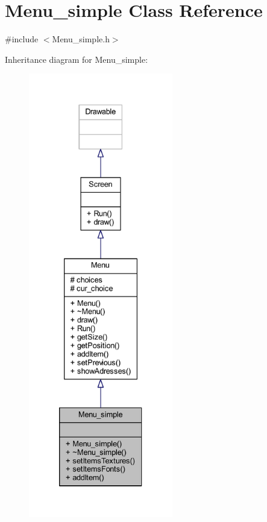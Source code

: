 \hypertarget{class_menu__simple}{}\section{Menu\+\_\+simple Class Reference}
\label{class_menu__simple}


{\ttfamily \#include $<$Menu\+\_\+simple.\+h$>$}



Inheritance diagram for Menu\+\_\+simple\+:\nopagebreak
\begin{figure}[H]
\begin{center}
\leavevmode
\includegraphics[height=550pt]{class_menu__simple__inherit__graph}
\end{center}
\end{figure}


